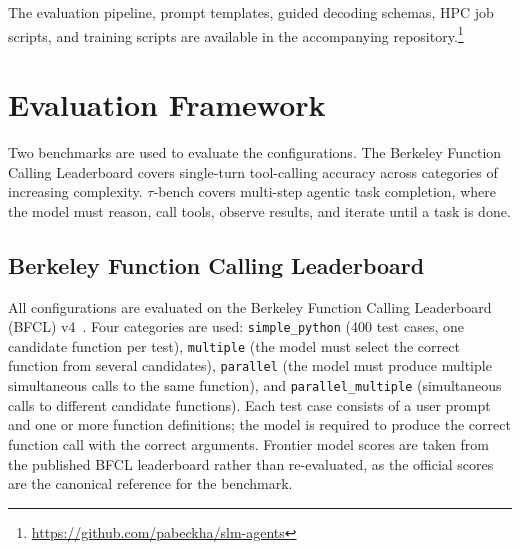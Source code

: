 The evaluation pipeline, prompt templates, guided decoding schemas,
HPC job scripts, and training scripts are available in the
accompanying repository.\footnote{\url{https://github.com/pabeckha/slm-agents}}

\section{Evaluation Framework} \label{sec:eval-framework}

Two benchmarks are used to evaluate the configurations.
The Berkeley Function Calling Leaderboard covers single-turn
tool-calling accuracy across categories of increasing
complexity. $\tau$-bench covers multi-step agentic task
completion, where the model must reason, call tools, observe
results, and iterate until a task is done.

\subsection{Berkeley Function Calling Leaderboard}

All configurations are evaluated on the Berkeley Function
Calling Leaderboard (BFCL) v4~\cite{bfcl2024}. Four
categories are used: \texttt{simple\_python} (400 test
cases, one candidate function per test), \texttt{multiple}
(the model must select the correct function from several
candidates), \texttt{parallel} (the model must produce
multiple simultaneous calls to the same function), and
\texttt{parallel\_multiple} (simultaneous calls to
different candidate functions). Each
test case consists of a user prompt and one or more function
definitions; the model is required to produce the correct
function call with the correct arguments. Frontier model
scores are taken from the published BFCL leaderboard rather
than re-evaluated, as the official scores are the canonical
reference for the benchmark.


